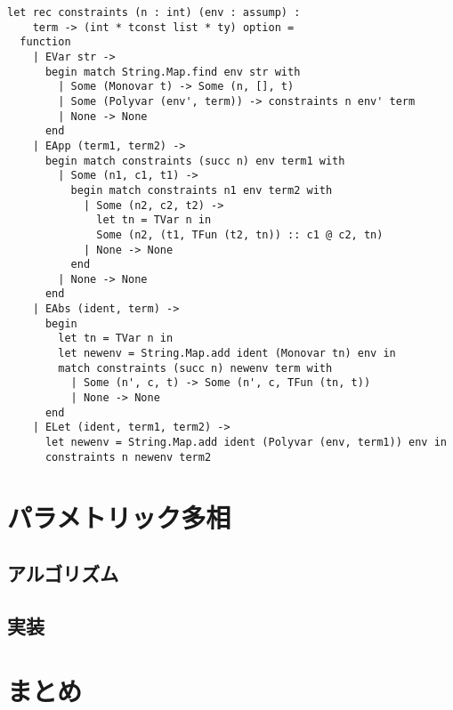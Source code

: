 \begin{lstlisting}
let rec constraints (n : int) (env : assump) :
    term -> (int * tconst list * ty) option =
  function
    | EVar str ->
      begin match String.Map.find env str with
        | Some (Monovar t) -> Some (n, [], t)
        | Some (Polyvar (env', term)) -> constraints n env' term
        | None -> None
      end
    | EApp (term1, term2) ->
      begin match constraints (succ n) env term1 with
        | Some (n1, c1, t1) ->
          begin match constraints n1 env term2 with
            | Some (n2, c2, t2) ->
              let tn = TVar n in
              Some (n2, (t1, TFun (t2, tn)) :: c1 @ c2, tn)
            | None -> None
          end
        | None -> None
      end
    | EAbs (ident, term) ->
      begin
        let tn = TVar n in
        let newenv = String.Map.add ident (Monovar tn) env in
        match constraints (succ n) newenv term with
          | Some (n', c, t) -> Some (n', c, TFun (tn, t))
          | None -> None
      end
    | ELet (ident, term1, term2) ->
      let newenv = String.Map.add ident (Polyvar (env, term1)) env in
      constraints n newenv term2
\end{lstlisting}



\section{パラメトリック多相}



\subsection{アルゴリズム}



\subsection{実装}



\section{まとめ}



